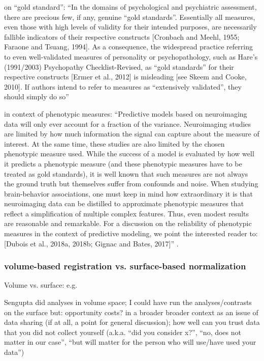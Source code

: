\citet{lilienfeld2015fifty} on ``gold standard'': ``In the domains of
psychological and psychiatric assessment, there are precious few, if any,
genuine ``gold standards''. Essentially all measures, even those with high
levels of validity for their intended purposes, are necessarily fallible
indicators of their respective constructs [Cronbach and Meehl, 1955; Faraone and
Tsuang, 1994]. As a consequence, the widespread practice referring to even
well-validated measures of personality or psychopathology, such as Hare’s
(1991/2003) Psychopathy Checklist-Revised, as ``gold standards'' for their
respective constructs [Ermer et al., 2012] is misleading [see Skeem and Cooke,
2010]. If authors intend to refer to measures as ``extensively validated'', they
should simply do so'' \citep{lilienfeld2015fifty}

\citet{scheinost2019ten} in context of phenotypic measures: ``Predictive models
based on neuroimaging data will only ever account for a fraction of the
variance. Neuroimaging studies are limited by how much information the signal
can capture about the measure of interest. At the same time, these studies are
also limited by the chosen phenotypic measure used.  While the success of a
model is evaluated by how well it predicts a phenotypic measure (and these
phenotypic measures have to be treated as gold standards), it is well known that
such measures are not always the ground truth but themselves suffer from
confounds and noise.  When studying brain-behavior associations, one must keep
in mind how extraordinary it is that neuroimaging data can be distilled to
approximate phenotypic measures that reflect a simplification of multiple
complex features. Thus, even modest results are reasonable and remarkable. For
a discussion on the reliability of phenotypic measures in the context of
predictive modeling, we point the interested reader to: [Dubois et al., 2018a,
2018b; Gignac and Bates, 2017]'' \citep{scheinost2019ten}.


\subsubsection{volume-based registration vs. surface-based normalization}
%
Volume vs. surface: e.g. \citep{desai2005volumetric}

Sengupta did analyses in volume space;
%
I could have run the analyses/contrasts on the surface
%
but: opportunity costs?
%
in a broader broader context as an issue of data sharing (if at all, a point for
general discussion); how well can you trust data that you did not collect
yourself (a.k.a. ``did you consider x?'', ``no, does not matter in our case'',
``but will matter for the person who will use/have used your data'')


